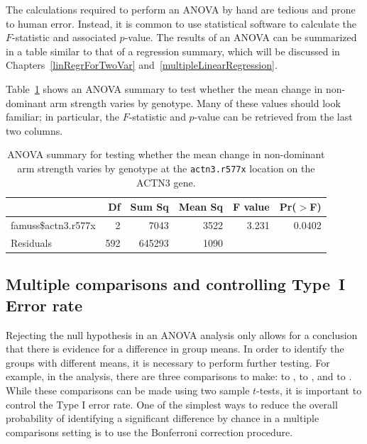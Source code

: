 The calculations required to perform an ANOVA by hand are tedious and prone to human error. Instead, it is common to use statistical software to calculate the $F$-statistic and associated $p$-value. The results of an ANOVA can be summarized in a table similar to that of a regression summary, which will be discussed in Chapters~\ref{linRegrForTwoVar} and~\ref{multipleLinearRegression}.

Table~\ref{anovaSummaryTableForFamuss} shows an ANOVA summary to test whether the mean change in non-dominant arm strength varies by genotype. Many of these values should look familiar; in particular, the $F$-statistic and $p$-value can be retrieved from the last two columns.

\begin{table}[ht]
	\centering
	\begin{tabular}{lrrrrr}
		\hline
		& Df & Sum Sq & Mean Sq & F value & Pr($>$F) \\ 
		\hline
		famuss\$actn3.r577x & 2 & 7043 & 3522 & 3.231 & 0.0402 \\ 
		Residuals & 592 & 645293 & 1090 &  &  \\    \hline
	\end{tabular}
	\caption{ANOVA summary for testing whether the mean change in non-dominant arm strength varies by genotype at the \texttt{actn3.r577x} location on the ACTN3 gene.}
	\label{anovaSummaryTableForFamuss}
\end{table}


\subsection{Multiple comparisons and controlling Type~I Error rate}
\label{multipleComparisonsAndControllingTheType1ErrorRate}


Rejecting the null hypothesis in an ANOVA analysis only allows for a conclusion that there is evidence for a difference in group means. In order to identify the groups with different means, it is necessary to perform further testing. For example, in the  analysis, there are three comparisons to make:  to ,  to , and  to . While these comparisons can be made using two sample $t$-tests, it is important to control the Type I error rate. One of the simplest ways to reduce the overall probability of identifying a significant difference by chance in a multiple comparisons setting is to use the Bonferroni correction procedure.

